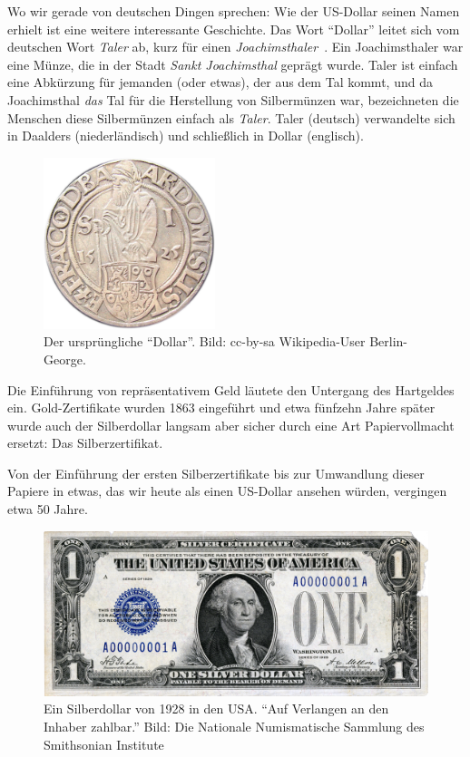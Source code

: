 Wo wir gerade von deutschen Dingen sprechen: Wie der US-Dollar seinen Namen
erhielt ist eine weitere interessante Geschichte. Das Wort \enquote{Dollar}
leitet sich vom deutschen Wort \textit{Taler} ab, kurz für einen
\textit{Joachimsthaler}~\cite{wiki:thaler}. Ein Joachimsthaler war eine Münze,
die in der Stadt \textit{Sankt Joachimsthal} geprägt wurde. Taler ist einfach
eine Abkürzung für jemanden (oder etwas), der aus dem Tal kommt, und da
Joachimsthal \textit{das} Tal für die Herstellung von Silbermünzen war,
bezeichneten die Menschen diese Silbermünzen einfach als \textit{Taler}. Taler (deutsch)
verwandelte sich in Daalders (niederländisch) und schließlich in Dollar
(englisch).

\begin{figure}
  \centering
  \includegraphics[width=5cm]{assets/images/joachimsthaler.png}
  \caption{Der ursprüngliche \enquote{Dollar}. Bild: cc-by-sa Wikipedia-User Berlin-George.}
  \label{fig:joachimsthaler}
\end{figure}

Die Einführung von repräsentativem Geld läutete den Untergang des Hartgeldes
ein. Gold-Zertifikate wurden 1863 eingeführt und etwa fünfzehn Jahre später
wurde auch der Silberdollar langsam aber sicher durch eine Art Papiervollmacht
ersetzt: Das Silberzertifikat. \cite{wiki:silver-certificate}

Von der Einführung der ersten Silberzertifikate bis zur Umwandlung dieser
Papiere in etwas, das wir heute als einen US-Dollar ansehen würden, vergingen
etwa 50 Jahre.

\begin{figure}
  \centering
  \includegraphics{assets/images/us-silver-dollar-note-smaller.png}
  \caption{Ein Silberdollar von 1928 in den USA. \enquote{Auf Verlangen an den
  Inhaber zahlbar.} Bild: Die Nationale Numismatische Sammlung des Smithsonian
  Institute}
  \label{fig:us-silver-dollar-note-smaller}
\end{figure}

